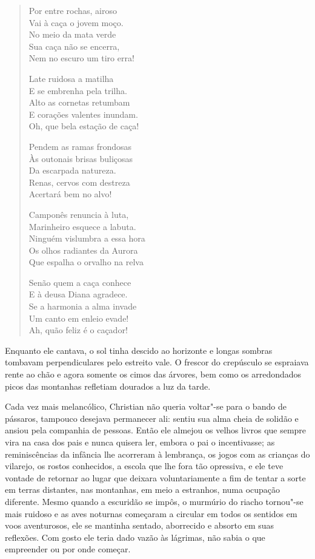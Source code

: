 \begin{verse}

Por entre rochas, airoso\\
Vai à caça o jovem moço.\\
No meio da mata verde\\
Sua caça não se encerra,\\
Nem no escuro um tiro erra!

Late ruidosa a matilha\\
E se embrenha pela trilha.\\
Alto as cornetas retumbam\\
E corações valentes inundam.\\
Oh, que bela estação de caça!

Pendem as ramas frondosas\\
Às outonais brisas buliçosas\\
Da escarpada natureza.\\
Renas, cervos com destreza\\
Acertará bem no alvo!

Camponês renuncia à luta,\\
Marinheiro esquece a labuta.\\
Ninguém vislumbra a essa hora\\
Os olhos radiantes da Aurora\\
Que espalha o orvalho na relva

Senão quem a caça conhece\\
E à deusa Diana agradece.\\
Se a harmonia a alma invade\\
Um canto em enleio evade!\\
Ah, quão feliz é o caçador!
\end{verse}

Enquanto ele cantava, o sol tinha descido ao horizonte e longas sombras
tombavam perpendiculares pelo estreito vale. O frescor do crepúsculo se
espraiava rente ao chão e agora somente os cimos das árvores, bem como
os arredondados picos das montanhas refletiam dourados a luz da tarde.

Cada vez mais melancólico, Christian não queria voltar"-se para o bando
de pássaros, tampouco desejava permanecer ali: sentiu sua alma cheia de
solidão e ansiou pela companhia de pessoas. Então ele almejou os velhos
livros que sempre vira na casa dos pais e nunca quisera ler, embora o
pai o incentivasse; as reminiscências da infância lhe acorreram à
lembrança, os jogos com as crianças do vilarejo, os rostos conhecidos,
a escola que lhe fora tão opressiva, e ele teve vontade de retornar ao
lugar que deixara voluntariamente a fim de tentar a sorte em terras
distantes, nas montanhas, em meio a estranhos, numa ocupação diferente.
Mesmo quando a escuridão se impôs, o murmúrio do riacho tornou"-se mais
ruidoso e as aves noturnas começaram a circular em todos os sentidos em
voos aventurosos, ele se mantinha sentado, aborrecido e absorto em suas
reflexões. Com gosto ele teria dado vazão às lágrimas, não sabia o que
empreender ou por onde começar.

